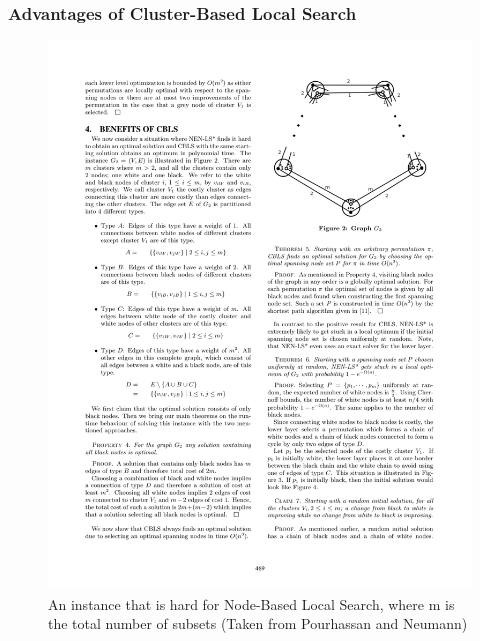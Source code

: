 \documentclass{beamer}
\begin{document}
\begin{frame}
\frametitle{Advantages of Cluster-Based Local Search}
\begin{figure}
	\centering
	\includegraphics[scale=0.8]{GTSPCase2.pdf}
	\caption{An instance that is hard for Node-Based Local Search, where m is the total number of subsets (Taken from Pourhassan and Neumann)}
\end{figure}
\end{frame}
\end{document}
